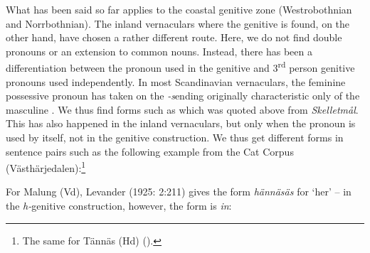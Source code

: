 {%

What has been said so far applies to the coastal genitive zone (Westrobothnian and Norrbothnian). The inland vernaculars where the genitive is found, on the other hand, have chosen a rather different route. Here, we do not find double pronouns or an extension to common nouns. Instead, there has been a differentiation between the pronoun used in the genitive and 3\textsuperscript{rd} person genitive pronouns used independently. In most Scandinavian vernaculars, the feminine possessive pronoun has taken on the\textit{ {}-s}\textstyleLinguisticExample{ }ending originally characteristic only of the masculine . We thus find forms such as  which was quoted above from \textit{Skelletmål}. This has also happened in the inland vernaculars, but only when the pronoun is used by itself, not in the genitive construction. We thus get different forms in sentence pairs such as the following example from the Cat Corpus (Västhärjedalen):\footnote{ The same for Tännäs (Hd) (\citet[22]{Olofsson1999}).}


\ea\label{}

\z 
\z

For Malung (Vd), Levander (1925: 2:211) gives the form \textit{hännäsäs} for ‘her’ – in the \textit{h-}genitive construction, however, the form is \textit{in}: 


}
